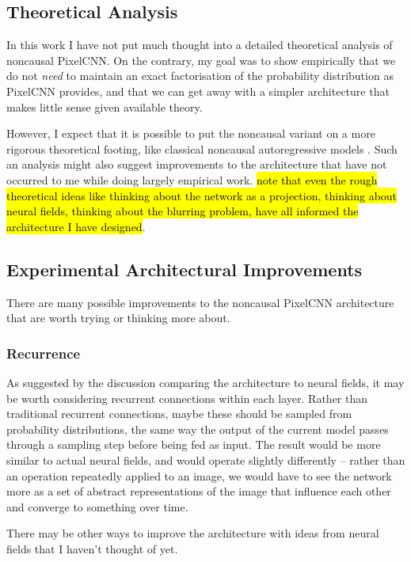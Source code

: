 \documentclass[10pt,a4paper]{article}
\begin{document}
\subsection{Theoretical Analysis}

In this work I have not put much thought into a detailed theoretical analysis of noncausal PixelCNN. On the contrary, my goal was to show empirically that we do not \emph{need} to maintain an exact factorisation of the probability distribution as PixelCNN provides, and that we can get away with a simpler architecture that makes little sense given available theory.

However, I expect that it is possible to put the noncausal variant on a more rigorous theoretical footing, like classical noncausal autoregressive models \cite{??}. Such an analysis might also suggest improvements to the architecture that have not occurred to me while doing largely empirical work. \hl{note that even the rough theoretical ideas like thinking about the network as a projection, thinking about neural fields, thinking about the blurring problem, have all informed the architecture I have designed}. 

\subsection{Experimental Architectural Improvements}

There are many possible improvements to the noncausal PixelCNN architecture that are worth trying or thinking more about.

\subsubsection{Recurrence}

As suggested by the discussion comparing the architecture to neural fields, it may be worth considering recurrent connections within each layer. Rather than traditional recurrent connections, maybe these should be sampled from probability distributions, the same way the output of the current model passes through a sampling step before being fed as input. The result would be more similar to actual neural fields, and would operate slightly differently -- rather than an operation repeatedly applied to an image, we would have to see the network more as a set of abstract representations of the image that influence each other and converge to something over time.

There may be other ways to improve the architecture with ideas from neural fields that I haven't thought of yet.
\end{document}
